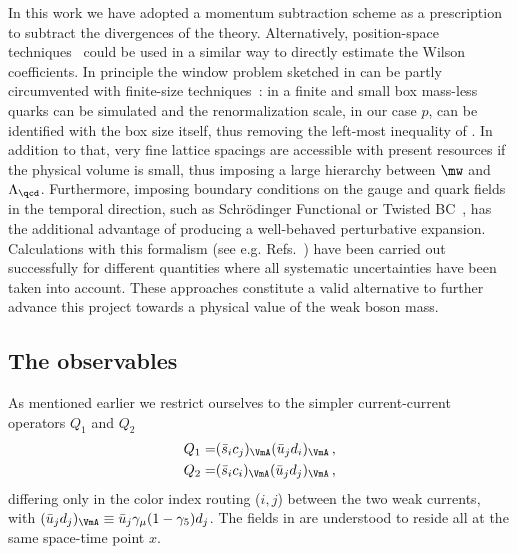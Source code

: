 \documentclass[aps,prd,twocolumn,nofootinbib,showpacs,superscriptaddress]{revtex4-1}
\begin{document}
In this work we have adopted a momentum subtraction scheme as a prescription
to subtract the divergences of the theory. Alternatively, 
position-space techniques~\cite{Martinelli:1997zc,Gimenez:2004me} could be used in a similar way to directly 
estimate the Wilson coefficients.
In principle the window problem 
sketched in  can be partly 
circumvented with finite-size techniques~\cite{Luscher:1991wu}:
in a finite and small box mass-less quarks can be simulated and
the renormalization scale, in our case $p$, can be identified with the box size
itself, thus removing the left-most inequality of . 
In addition to that, very fine lattice
spacings are accessible with present resources 
if the physical volume is small, thus imposing a large
hierarchy between $\mw$ and $\Lambda_\qcd$.
Furthermore, imposing boundary conditions 
on the gauge and quark fields in the temporal
direction, such as Schr\"odinger Functional or Twisted BC~\cite{Luscher:1993gh,deDivitiis:1994yz,Jansen:1995ck,tHooft:1979rtg,tHooft:1981nnx},  
has the additional advantage of producing a well-behaved perturbative expansion.
Calculations with this formalism (see e.g. Refs.~\cite{Bruno:2017gxd,Brida:2016flw}) 
have been carried out successfully for 
different quantities where all systematic uncertainties have been taken into account.
These approaches constitute a valid alternative to further advance 
this project towards a physical value of the weak boson mass.



\subsection{The observables}

As mentioned earlier we restrict ourselves to the simpler current-current operators
$Q_1$ and $Q_2$
\begin{equation}
\begin{split}
Q_1 = & (\bar s_i c_j)_{\VmA} (\bar u_j d_i)_{\VmA} \,, \\
Q_2 = & (\bar s_i c_i)_{\VmA} (\bar u_j d_j)_{\VmA} \,,
\end{split}
\label{eq:Q1_Q2}
\end{equation}
differing only in the color index routing ($i,j$) 
between the two weak currents,
with $ (\bar u_j d_j)_\VmA \equiv \bar u_j \gamma_\mu (1-\gamma_5) d_j $. 
The fields in  are understood to reside all at the same space-time point $x$.
\end{document}
